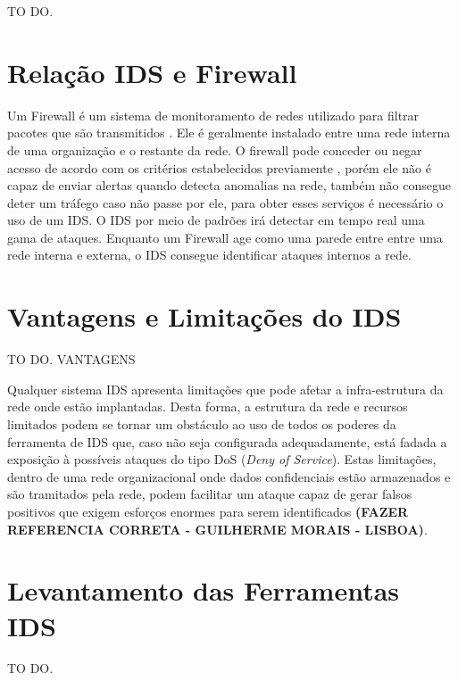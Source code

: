 		TO DO.

	\section{Relação IDS e Firewall}
	\label{sec:IDS_Firewall}

	Um Firewall é um sistema de monitoramento de redes utilizado para filtrar pacotes que são transmitidos . Ele é geralmente instalado entre uma rede interna de uma organização e o restante da rede. O firewall pode conceder ou negar acesso de acordo com os critérios estabelecidos previamente \cite{Morais}, porém ele não é capaz de enviar alertas quando detecta anomalias na rede, também não consegue deter um tráfego caso não passe por ele, para obter esses serviços é necessário o uso de um IDS. O IDS por meio de padrões irá detectar em tempo real uma gama de ataques. Enquanto um Firewall age como uma parede entre entre uma rede interna e externa, o IDS consegue identificar ataques internos a rede.

	\section{Vantagens e Limitações do IDS}
	\label{sec:IDS_VeL}

		TO DO. VANTAGENS
		
	Qualquer sistema IDS apresenta limitações que pode afetar a infra-estrutura da rede onde estão implantadas. Desta forma, a estrutura da rede e recursos limitados podem se tornar um obstáculo ao uso de todos os poderes da ferramenta de IDS que, caso não seja configurada adequadamente, está fadada a exposição à possíveis ataques do tipo DoS (\textit{Deny of Service}). Estas limitações, dentro de uma rede organizacional onde dados confidenciais estão armazenados e são tramitados pela rede, podem facilitar um ataque capaz de gerar falsos positivos que exigem esforços enormes para serem identificados \textbf{(FAZER REFERENCIA CORRETA - GUILHERME MORAIS - LISBOA)}.

	\section{Levantamento das Ferramentas IDS}
	\label{sec:IDS_Ferramentas}
	

		TO DO.

